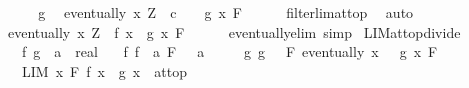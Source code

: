 \begin{isabellebody}
\ \ \isamarkupfalse%
\ \isamarkupfalse%
\ g\ \isamarkupfalse%
\ {\isachardoublequoteopen}eventually\ {\isacharparenleft}{\kern0pt}{\isasymlambda}x{\isachardot}{\kern0pt}\ Z\ {\isacharminus}{\kern0pt}\ {\isacharparenleft}{\kern0pt}c\ {\isacharminus}{\kern0pt}\ {}{\isacharparenright}{\kern0pt}\ {\isasymle}\ g\ x{\isacharparenright}{\kern0pt}\ F{\isachardoublequoteclose}\isanewline
\ \ \ \ \isamarkupfalse%
\ filterlim{\isacharunderscore}{\kern0pt}at{\isacharunderscore}{\kern0pt}top\ \isamarkupfalse%
\ auto\isanewline
\ \ \isamarkupfalse%
\ \isamarkupfalse%
\ {\isachardoublequoteopen}eventually\ {\isacharparenleft}{\kern0pt}{\isasymlambda}x{\isachardot}{\kern0pt}\ Z\ {\isasymle}\ f\ x\ {\isacharplus}{\kern0pt}\ g\ x{\isacharparenright}{\kern0pt}\ F{\isachardoublequoteclose}\isanewline
\ \ \ \ \isamarkupfalse%
\ eventually{\isacharunderscore}{\kern0pt}elim\ simp\isanewline
{}\isamarkupfalse%
%
\endisatagproof
{\isafoldproof}%
%
\isadelimproof
\isanewline
%
\endisadelimproof
\isanewline
{}\isamarkupfalse%
\ LIM{\isacharunderscore}{\kern0pt}at{\isacharunderscore}{\kern0pt}top{\isacharunderscore}{\kern0pt}divide{\isacharcolon}{\kern0pt}\isanewline
\ \ \ f\ g\ {\isacharcolon}{\kern0pt}{\isacharcolon}{\kern0pt}\ {\isachardoublequoteopen}{\isacharprime}{\kern0pt}a\ {\isasymRightarrow}\ real{\isachardoublequoteclose}\isanewline
\ \ \ f{\isacharcolon}{\kern0pt}\ {\isachardoublequoteopen}{\isacharparenleft}{\kern0pt}f\ {\isasymlonglongrightarrow}\ a{\isacharparenright}{\kern0pt}\ F{\isachardoublequoteclose}\ {\isachardoublequoteopen}{}\ {\isacharless}{\kern0pt}\ a{\isachardoublequoteclose}\isanewline
\ \ \ \ \ g{\isacharcolon}{\kern0pt}\ {\isachardoublequoteopen}{\isacharparenleft}{\kern0pt}g\ {\isasymlonglongrightarrow}\ {}{\isacharparenright}{\kern0pt}\ F{\isachardoublequoteclose}\ {\isachardoublequoteopen}eventually\ {\isacharparenleft}{\kern0pt}{\isasymlambda}x{\isachardot}{\kern0pt}\ {}\ {\isacharless}{\kern0pt}\ g\ x{\isacharparenright}{\kern0pt}\ F{\isachardoublequoteclose}\isanewline
\ \ \ {\isachardoublequoteopen}LIM\ x\ F{\isachardot}{\kern0pt}\ f\ x\ {\isacharslash}{\kern0pt}\ g\ x\ {\isacharcolon}{\kern0pt}{\isachargreater}{\kern0pt}\ at{\isacharunderscore}{\kern0pt}top{\isachardoublequoteclose}\isanewline
%
\isadelimproof
\ \ %
\endisadelimproof
%
\isatagproof
{}\isamarkupfalse%

\end{isabellebody}
